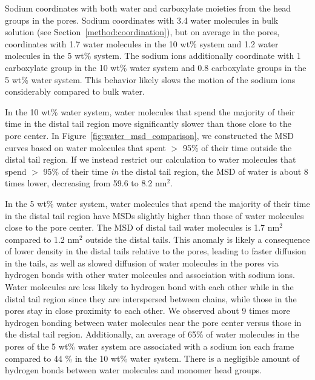 \documentclass[journal=jpcbfk,manuscript=article]{achemso}
\begin{document}
  Sodium coordinates with both water and carboxylate moieties from the head
  groups in the pores. Sodium coordinates with 3.4 water molecules in bulk 
  solution (see Section~\ref{method:coordination}), but on average in the pores,
  coordinates with 1.7 water molecules in the 10 wt\% system and 1.2 water
  molecules in the 5 wt\% system. The sodium ions additionally coordinate with
  1 carboxylate group in the 10 wt\% water system and 0.8 carboxylate groups 
  in the 5 wt\% water system. This behavior likely slows the motion of the 
  sodium ions considerably compared to bulk water.

  In the 10 wt\% water system, water molecules that spend the majority of 
  their time in the distal tail region move significantly slower than those
  close to the pore center. In Figure~\ref{fig:water_msd_comparison}, we 
  constructed the MSD curves based on water molecules that spent $>$ 95\% of their
  time outside the distal tail region. If we instead restrict our calculation to
  water molecules that spend $>$ 95\% of their time \textit{in} the distal tail region, 
  the MSD of water is about 8 times lower, decreasing from 59.6 to 8.2 nm$^2$. 
  
  In the 5 wt\% water system, water molecules that spend the majority of their 
  time in the distal tail region have MSDs slightly higher than those of water molecules
  close to the pore center. The MSD of distal tail water molecules is 1.7 nm$^2$
  compared to 1.2 nm$^2$ outside the distal tails. This anomaly is likely a 
  consequence of lower density in the distal tails relative to the pores,
  leading to faster diffusion in the tails,
  as well as slowed diffusion of water molecules in the pores via hydrogen bonds
  with other water molecules and association with sodium ions. Water molecules 
  are less likely to hydrogen bond with each other while in the distal tail 
  region since they are interspersed between chains, while those in 
  the pores stay in close proximity to each other. We observed about 9 times more  %
  hydrogen bonding between water molecules near the pore center versus those in 
  the distal tail region. Additionally, an average of 65\% of water molecules in
  the pores of the 5 wt\% water system are associated with a sodium ion each frame
  compared to 44 \% in the 10 wt\% water system. There is a negligible amount of
  hydrogen bonds between water molecules and monomer head groups. 
  
\end{document}
